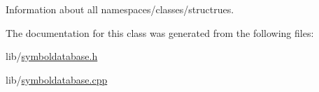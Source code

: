 Information about all namespaces/classes/structrues. 



The documentation for this class was generated from the following files\-:\begin{DoxyCompactItemize}
\item 
lib/\hyperlink{symboldatabase_8h}{symboldatabase.\-h}\item 
lib/\hyperlink{symboldatabase_8cpp}{symboldatabase.\-cpp}\end{DoxyCompactItemize}
